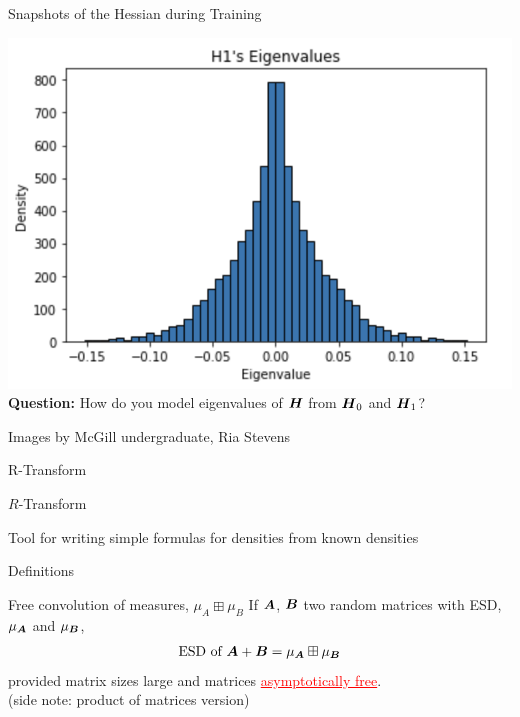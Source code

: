 \documentclass[10pt]{beamer}
\begin{document}
\begin{frame}{Snapshots of the Hessian during Training}
\begin{center}
          \includegraphics[scale = 0.3]{part-2-images/Hessian_H_1.png}\\
          \textbf{Question:} How do you model eigenvalues of $\HH$ from $\HH_0$ and $\HH_1$?
    \end{center}
    
    
    \hfill { \footnotesize Images by McGill undergraduate, Ria Stevens }
\end{frame}

\begin{frame}{R-Transform}
\begin{exampleblock}{$R$-Transform}
\begin{center}
    Tool for writing simple formulas for densities from known densities
\end{center}
\end{exampleblock}
\end{frame}

\begin{frame}{Definitions}
\begin{exampleblock}{Free convolution of measures, $\mu_{A} \boxplus \mu_B$}
If $\AA$, $\BB$ two random matrices with ESD, $\mu_{\AA}$ and $\mu_{\BB}$, 
\[\text{ESD of $\AA+ \BB$} = \mu_{\AA} \boxplus \mu_{\BB}\]
provided matrix sizes large and matrices \textcolor{red}{\underline{asymptotically free}}. \\
{\footnotesize (side note: product of matrices version)}
\end{exampleblock}
\end{frame}
\end{document}
